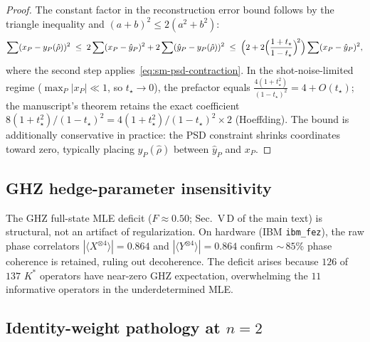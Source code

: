\documentclass[twocolumn,prx,aps,superscriptaddress,longbibliography]{revtex4-2}
\begin{document}
\begin{proof}
The constant factor in the reconstruction error bound
follows by the triangle inequality and $(a+b)^2 \le 2(a^2+b^2)$:
\[
  \sum(x_P - y_P(\hat\rho))^2
  \;\le\; 2\sum(x_P - \hat{y}_P)^2
       + 2\sum(\hat{y}_P - y_P(\hat\rho))^2
  \;\le\; \Bigl(2 + 2\Bigl(\frac{1+t_\star}{1-t_\star}\Bigr)^{\!2}\Bigr)
          \sum(x_P - \hat{y}_P)^2,
\]
where the second step applies~\eqref{eq:sm-psd-contraction}.
In the shot-noise-limited regime ($\max_P |x_P| \ll 1$,
so $t_\star \to 0$), the prefactor equals
$\frac{4(1+t_\star^2)}{(1-t_\star)^2} = 4 + O(t_\star)$;
the manuscript's theorem retains the exact
coefficient~$8(1{+}t_\star^2)/(1{-}t_\star)^2
= 4(1{+}t_\star^2)/(1{-}t_\star)^2 \times 2$ (Hoeffding).
The bound is additionally conservative in practice: the PSD
constraint shrinks coordinates toward zero, typically
placing $y_P(\hat\rho)$ between $\hat{y}_P$ and $x_P$.
\end{proof}

\subsection{GHZ hedge-parameter insensitivity}
\label{sec:hedge-scan}

The GHZ full-state MLE deficit ($F \approx 0.50$;
Sec.~V\,D of the main text) is structural, not an artifact of
regularization.  On hardware (IBM \texttt{ibm\_fez}), the raw
phase correlators $|\langle X^{\otimes 4}\rangle| = 0.864$ and
$|\langle Y^{\otimes 4}\rangle| = 0.864$ confirm ${\sim}\,85$\%
phase coherence is retained, ruling out decoherence.  The deficit
arises because $126$ of $137$ $K^*$ operators have near-zero GHZ
expectation, overwhelming the $11$ informative operators in the
underdetermined MLE\@.

\subsection{Identity-weight pathology at $n = 2$}
\label{sec:identity-pathology}
\end{document}
